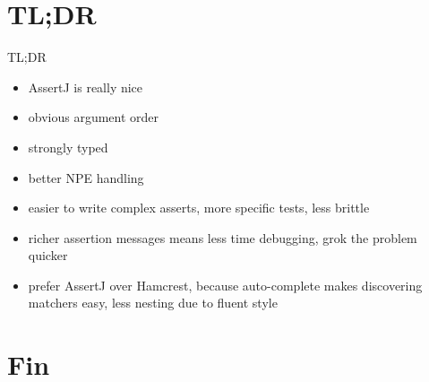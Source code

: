 \documentclass[xetex,12pt,aspectratio=169]{beamer}
\begin{document}
\section{TL;DR}


\begin{frame}[fragile]{TL;DR}
\begin{itemize}
\item AssertJ is really nice
\item obvious argument order
\item strongly typed
\item better NPE handling
\item easier to write complex asserts, more specific tests, less brittle
\item richer assertion messages means less time debugging, grok the problem quicker
\item prefer AssertJ over Hamcrest, because auto-complete makes discovering matchers easy, less nesting due to fluent style
\end{itemize}
\end{frame}


\section{Fin}
\end{document}
